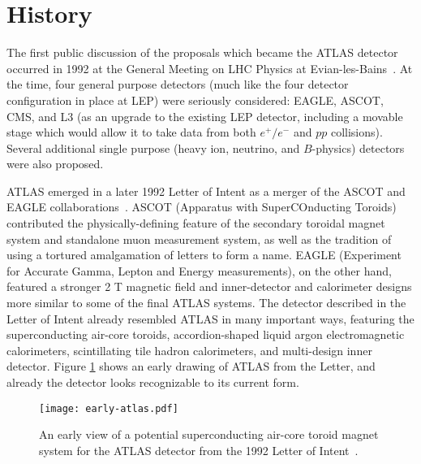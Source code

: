 
\section{History}

The first public discussion of the proposals which became the ATLAS detector occurred in 1992 at the General Meeting on LHC Physics at Evian-les-Bains~\cite{Evian,EvianCourier}. At the time, four general purpose detectors (much like the four detector configuration in place at LEP) were seriously considered: EAGLE, ASCOT, CMS, and L3 (as an upgrade to the existing LEP detector, including a movable stage which would allow it to take data from both $e^+/e^-$ and $pp$ collisions). Several additional single purpose (heavy ion, neutrino, and $B$-physics) detectors were also proposed.

ATLAS emerged in a later 1992 Letter of Intent as a merger of the ASCOT and EAGLE collaborations~\cite{ATLAS-LoI}. ASCOT (Apparatus with SuperCOnducting Toroids) contributed the physically-defining feature of the secondary toroidal magnet system and standalone muon measurement system, as well as the tradition of using a tortured amalgamation of letters to form a name. EAGLE (Experiment for Accurate Gamma, Lepton and Energy measurements), on the other hand, featured a stronger 2 T magnetic field and inner-detector and calorimeter designs more similar to some of the final ATLAS systems. The detector described in the Letter of Intent already resembled ATLAS in many important ways, featuring the superconducting air-core toroids, accordion-shaped liquid argon electromagnetic calorimeters, scintillating tile hadron calorimeters, and multi-design inner detector. Figure \ref{fig:detector:earlyatlas} shows an early drawing of ATLAS from the Letter, and already the detector looks recognizable to its current form.



\begin{figure}
\centering
\texttt{[image: early-atlas.pdf]}
\caption{An early view of a potential superconducting air-core toroid magnet system for the ATLAS detector from the 1992 Letter of Intent~\cite{ATLAS-LoI}.}
\label{fig:detector:earlyatlas}
\end{figure}


